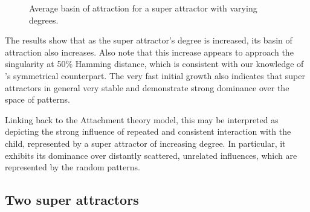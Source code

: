 \begin{figure}[h]
  \centering

\caption{Average basin of attraction for a super attractor with varying degrees.}
\label{fig:one super plot}
\end{figure}


The results show that as the super attractor's degree is increased, its basin of attraction also increases. Also note that this increase appears to approach the singularity at 50\% Hamming distance, which is consistent with our knowledge of \psuper's symmetrical counterpart. The very fast initial growth also indicates that super attractors in general very stable and demonstrate strong dominance over the space of patterns.


Linking back to the Attachment theory model, this may be interpreted as depicting the strong influence of repeated and consistent interaction with the child, represented by a super attractor of increasing degree. In particular, it exhibits its dominance over distantly scattered, unrelated influences, which are represented by the random patterns.



\subsection{Two super attractors}


\newcommand{\poriginsuper}{$p_{origin}$}
\newcommand{\pnewsuper}{$p_{new}$}
\newcommand{\dorigin}{$d_{origin}$}
\newcommand{\dnew}{$d_{new}$}

